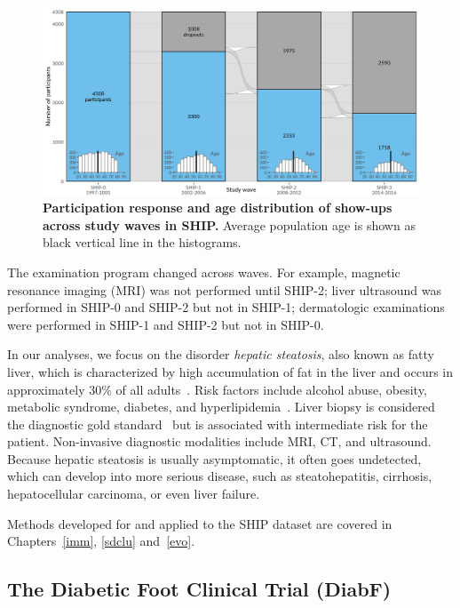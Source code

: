 \documentclass[
  oneside]{book}
\begin{document}
\begin{figure}[h]

{\centering \includegraphics[width=1\linewidth]{figures/02-ship-sankey} 

}

\caption{\textbf{Participation response and age distribution of show-ups across study waves in SHIP.} Average population age is shown as black vertical line in the histograms.}\label{fig:02-ship-sankey}
\end{figure}

The examination program changed across waves.
For example, magnetic resonance imaging (MRI) was not performed until SHIP-2; liver ultrasound was performed in SHIP-0 and SHIP-2 but not in SHIP-1; dermatologic examinations were performed in SHIP-1 and SHIP-2 but not in SHIP-0.

In our analyses, we focus on the disorder \emph{hepatic steatosis}, also known as fatty liver, which is characterized by high accumulation of fat in the liver and occurs in approximately 30\% of all adults~\autocite{Voelzke:SHIP11,volzke2005hepatic}.
Risk factors include alcohol abuse, obesity, metabolic syndrome, diabetes, and hyperlipidemia~\autocite{antunes2019fatty}.
Liver biopsy is considered the diagnostic gold standard~\autocite{antunes2019fatty} but is associated with intermediate risk for the patient.
Non-invasive diagnostic modalities include MRI, CT, and ultrasound.
Because hepatic steatosis is usually asymptomatic, it often goes undetected, which can develop into more serious disease, such as steatohepatitis, cirrhosis, hepatocellular carcinoma, or even liver failure.

Methods developed for and applied to the SHIP dataset are covered in Chapters~\ref{imm}, \ref{sdclu} and~\ref{evo}.

\hypertarget{background-data-diabf}{%
\subsection{The Diabetic Foot Clinical Trial (DiabF)}\label{background-data-diabf}}
\end{document}
